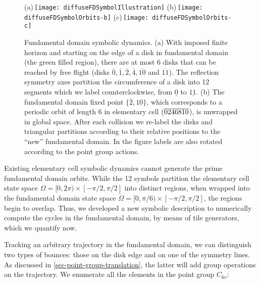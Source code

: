 \begin{figure}[htbp]
  (a)\,\texttt{[image: diffuseFDSymbolIllustration]}
  (b)\,\texttt{[image: diffuseFDSymbolOrbits-b]}
  (c)\,\texttt{[image: diffuseFDSymbolOrbits-c]}
  \caption{\label{fig-fdflights}
  Fundamental domain symbolic dynamics.
  (a) With  imposed finite horizon and starting on the edge of a disk in
  fundamental  domain (the green filled region), there are at most 6
  disks that can be reached by free flight (disks
  $\overline{0},\overline{1},\overline{2},\overline{4},\overline{10}$ and
  $\overline{11}$).
  The reflection symmetry axes partition the circumference of
  a disk into 12 segments which we
  label counterclockwise, from $\underline{0}$ to $\underline{11}$. 
  (b) The fundamental domain fixed point
  $\{\overline{2},\underline{10}\}$, which corresponds to a periodic
  orbit of length 6 in elementary cell (${\overline{0246810}}$), is unwrapped
  in   global space. After each collision we re-label the disks and
  triangular   partitions according to their relative positions to the
  ``new'' fundamental   domain. In the figure labels are also rotated
  according to the point   group actions.
  }
\end{figure}



Existing elementary cell symbolic dynamics cannot generate the prime fundamental domain orbits. While the 12 symbols partition the elementary cell state space $\Omega=[0, 2\pi)\times [-\pi/2, \pi/2]$ into distinct regions, when wrapped into the fundamental domain state space $\tilde{\Omega}=[0, \pi/6)\times [-\pi/2, \pi/2]$, the regions begin to overlap. Thus, we developed a new symbolic description to numerically compute the cycles in the fundamental domain, by means of tile generators, which we quantify now. 

Tracking an arbitrary trajectory in the fundamental domain, we can distinguish two types of bounces: those on the disk edge and on one of the symmetry lines. As discussed in \ref{sec-point-group-translation}, the latter will add group operations on the trajectory. We enumerate all the elements in the point group $C_{6v}$:


